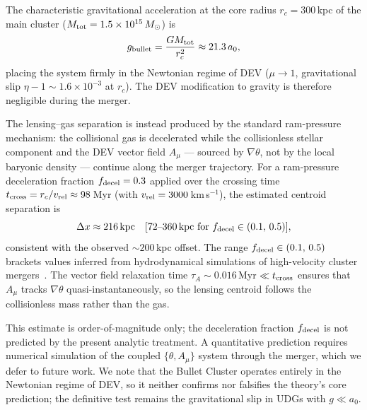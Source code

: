 \documentclass[aps,prd,twocolumn,showpacs,superscriptaddress]{revtex4-2}
\newcommand{\aO}{a_0}
\begin{document}
The characteristic gravitational acceleration at the core
radius $r_c = 300$\,kpc of the main cluster
($M_{\rm tot} = 1.5\times10^{15}\,M_\odot$) is
\begin{equation}
  g_{\rm bullet} = \frac{GM_{\rm tot}}{r_c^2}
  \approx 21.3\,\aO,
\end{equation}
placing the system firmly in the Newtonian regime of DEV
($\mu \to 1$, gravitational slip $\eta - 1 \sim 1.6\times10^{-3}$
at $r_c$). The DEV modification to gravity is therefore
negligible during the merger.

The lensing--gas separation is instead produced by the
standard ram-pressure mechanism: the collisional gas is
decelerated while the collisionless stellar component and
the DEV vector field $A_\mu$ --- sourced by $\nabla\theta$,
not by the local baryonic density --- continue along the
merger trajectory. For a ram-pressure deceleration fraction
$f_{\rm decel} = 0.3$ applied over the crossing time
$t_{\rm cross} = r_c/v_{\rm rel} \approx 98$\,Myr
(with $v_{\rm rel} = 3000$\,km\,s$^{-1}$), the estimated
centroid separation is
\begin{equation}
  \Delta x \approx 216\,\mathrm{kpc}
  \quad [72\text{--}360\,\mathrm{kpc\ for\ }
  f_{\rm decel}\in(0.1,\,0.5)],
\end{equation}
consistent with the observed ${\sim}200$\,kpc offset.
The range $f_{\rm decel}\in(0.1,\,0.5)$ brackets values
inferred from hydrodynamical simulations of high-velocity
cluster mergers~\cite{SpringelFarrar2007}.
The vector field relaxation time $\tau_A \sim 0.016$\,Myr
$\ll t_{\rm cross}$ ensures that $A_\mu$ tracks
$\nabla\theta$ quasi-instantaneously, so the lensing
centroid follows the collisionless mass rather than the gas.

This estimate is order-of-magnitude only; the deceleration
fraction $f_{\rm decel}$ is not predicted by the present
analytic treatment. A quantitative prediction requires
numerical simulation of the coupled $\{\theta, A_\mu\}$
system through the merger, which we defer to future work.
We note that the Bullet Cluster operates entirely in the
Newtonian regime of DEV, so it neither confirms nor
falsifies the theory's core prediction; the definitive test
remains the gravitational slip in UDGs with $g \ll \aO$.




\end{document}
